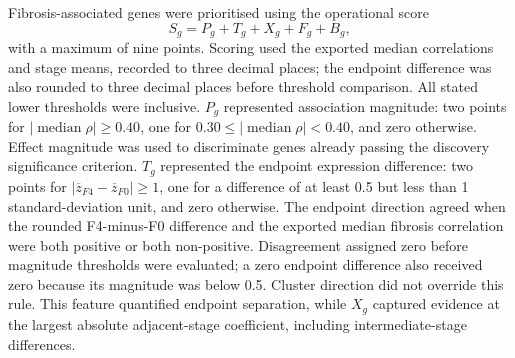\documentclass[11pt,a4paper]{article}
\begin{document}
Fibrosis-associated genes were prioritised using the operational score
\[
S_g=P_g+T_g+X_g+F_g+B_g,
\]
with a maximum of nine points. Scoring used the exported median correlations and stage means, recorded to three decimal places; the endpoint difference was also rounded to three decimal places before threshold comparison. All stated lower thresholds were inclusive. \(P_g\) represented association magnitude: two points for \(|\operatorname{median}\rho|\geq0.40\), one for \(0.30\leq|\operatorname{median}\rho|<0.40\), and zero otherwise. Effect magnitude was used to discriminate genes already passing the discovery significance criterion. \(T_g\) represented the endpoint expression difference: two points for \(|\overline{z}_{F4}-\overline{z}_{F0}|\geq1\), one for a difference of at least 0.5 but less than 1 standard-deviation unit, and zero otherwise. The endpoint direction agreed when the rounded F4-minus-F0 difference and the exported median fibrosis correlation were both positive or both non-positive. Disagreement assigned zero before magnitude thresholds were evaluated; a zero endpoint difference also received zero because its magnitude was below 0.5. Cluster direction did not override this rule. This feature quantified endpoint separation, while \(X_g\) captured evidence at the largest absolute adjacent-stage coefficient, including intermediate-stage differences.
\end{document}
